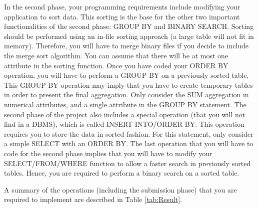 In the second phase, your programming requirements include modifying your application to sort data. This sorting
is the base for the other two important functionalities of the second phase: GROUP BY and BINARY SEARCH.
Sorting should be performed using an in-file sorting approach (a large table will not fit in memory). Therefore, you will have to merge
binary files if you decide to include the merge sort algorithm. You can assume that there will be at most one attribute
in the sorting function.
Once you have coded your ORDER BY operation, you will have to perform a GROUP BY on a previously sorted table. This GROUP BY operation may imply that you have to create temporary tables in order to present the final aggregation. Only consider the SUM aggregation in numerical attributes, and a single attribute in the GROUP BY statement.
The second phase of the project also includes a special operation (that you will not find in a DBMS), which is called
INSERT INTO/ORDER BY. This operation requires you to store the data in sorted fashion. For this statement, only consider a simple SELECT with an ORDER BY.
The last operation that you will have to code for the second phase implies that you will have to modify your SELECT/FROM/WHERE function to allow a faster search in previously sorted tables. Hence, you are required to perform a binary search on a
sorted table.

A summary of the operations (including the submission phase) that you are required to implement are described in Table \ref{tab:Result}.

